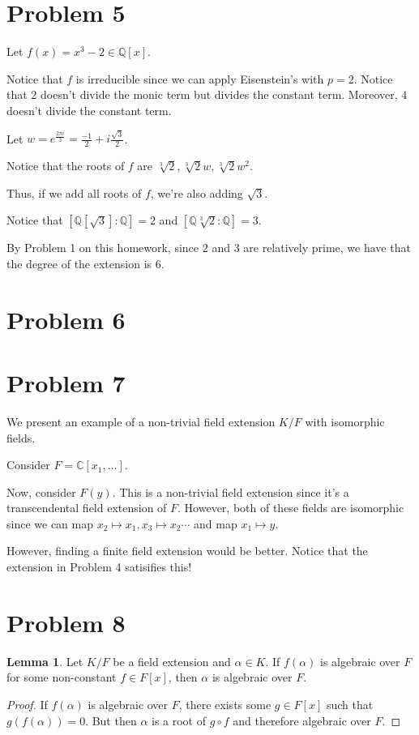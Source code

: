 \documentclass{article}
\theoremstyle{definition}
\newtheorem{lemma}[theorem]{Lemma}
\begin{document}
\section{Problem 5}


Let $ f(x) = x^{3} - 2 \in \mathbb{Q}[x] $. 

Notice that $ f $ is irreducible since we can apply Eisenstein's with $ p = 2 $.
Notice that $ 2 $ doesn't divide the monic term but divides the constant term.
Moreover, $ 4 $ doesn't divide the constant term.

Let $ w = e^{\frac{2\pi i}{3}}  = \frac{-1}{2} + i \frac{\sqrt{3}}{2} $.

Notice that the roots of $ f $ are $ \sqrt[3]{2}, \sqrt[3]{2} w, \sqrt[3]{2} w^{2} $.

Thus, if we add all roots of $ f $, we're also adding $ \sqrt{3} $.

Notice that $ [\mathbb{Q}[\sqrt{3}] : \mathbb{Q}] = 2 $ and $ [\mathbb{Q}\sqrt[3]{2} : \mathbb{Q}] = 3 $.

By Problem 1 on this homework, since $ 2 $ and $ 3 $ are relatively prime, we have that the degree
of the extension is $ 6 $.

\section{Problem 6}

\section{Problem 7}

We present an example of a non-trivial field extension $ K/F $ with isomorphic fields.

Consider $ F = \mathbb{C}[x_{1}, \ldots] $.

Now, consider $ F(y) $. This is a non-trivial field extension since it's a transcendental field extension of $ F $.
However, both of these fields are isomorphic since we can map $ x_{2} \mapsto x_{1}, x_{3} \mapsto x_{2} \cdots $
and map $ x_{1} \mapsto y $.

However, finding a finite field extension would be better. Notice that the extension in Problem 4 satisifies this!



\section{Problem 8}

\begin{lemma}
    Let $ K/F $ be a field extension and $ \alpha \in K $.
    If $ f(\alpha) $ is algebraic over $ F $ for some non-constant $ f \in F[x] $,
    then $ \alpha $ is algebraic over $ F $.
\end{lemma}
\begin{proof}
    If $ f(\alpha) $ is algebraic over $ F $, there exists some $ g \in F[x] $ such that
    $ g(f(\alpha)) = 0 $.  But then $ \alpha $ is a root of $ g \circ f $ and therefore
    algebraic over $ F $.
\end{proof}
\end{document}
